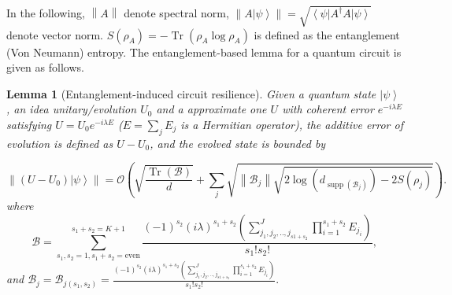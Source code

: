 \documentclass[12pt]{article}
\newtheorem{lemma}{Lemma}
\newcommand{\ket}[1]{\left|#1\right\rangle}
\newcommand{\bra}[1]{\left\langle #1\right|}
\newcommand{\norm}[1]{\left\lVert #1\right\rVert}
\newcommand{\mc}{\mathcal}
\newcommand{\Tr}{\operatorname{Tr}}
\DeclareMathOperator{\support}{supp}
\begin{document}
In the following, $\norm{A}$ denote spectral norm, $\norm{A\ket{\psi}}=\sqrt{\bra{\psi}A^\dag A\ket{\psi}}$ denote vector norm. $S(\rho_A)=-\Tr(\rho_A\log\rho_A)$ is defined as the entanglement (Von Neumann) entropy. The entanglement-based lemma for a quantum circuit is given as follows.




\begin{lemma} [Entanglement-induced circuit resilience]Given a quantum state $\ket{\psi}$, an idea unitary/evolution $U_0$ and a approximate one $U$ with coherent error $e^{-i\lambda E}$ satisfying $U=U_0e^{-i\lambda E}$ ($E=\sum_j E_j$ is a Hermitian operator), the additive error of evolution is defined as $U-U_0$, and the evolved state is bounded by 

\begin{equation}
    \norm{(U-U_0)\ket{\psi}}= \mc{O}( \sqrt{\frac{\Tr(\mathscr{B})}{d}}+\sum_j \sqrt{{\norm{\mathscr{B}_j}} \sqrt{2\log(d_{\support(\mathscr{B}_{j})})-2S(\rho_{j})}}).
\end{equation}
 where 
$$\mathscr{B}=\sum_{s_1,s_2=1, s_1+s_2=\text{even}}^{s_1+s_2=K+1} \frac{(-1)^{s_2}({i}\lambda )^{s_1+s_2} (\sum_{j_1,j_2,..,j_{s1+s_2}}^J\prod_{i=1}^{s_1+s_2}E_{j_i})} {s_1!s_2!}, $$
and 
$\mathscr{B}_j=\mathscr{B}_{j(s_1,s_2)}=\frac{(-1)^{s_2}({i}\lambda )^{s_1+s_2} (\sum_{j_1,j_2,..,j_{s1+s_2}}^J\prod_{i=1}^{s_1+s_2}E_{j_i})} {s_1!s_2!}.$
\label{lemma:entanglement-induced}
\end{lemma}
\end{document}
